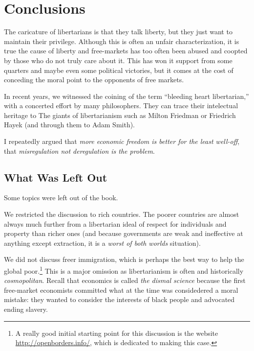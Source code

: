 \chapter{Conclusions}

The caricature of libertarians is that they talk liberty, but they just want to
maintain their privilege. Although this is often an unfair characterization, it
is true the cause of liberty and free-markets has too often been abused and
coopted by those who do not truly care about it. This has won it support from
some quarters and maybe even some political victories, but it comes at the cost
of conceding the moral point to the opponents of free markets.

In recent years, we witnessed the coining of the term ``bleeding heart
libertarian,'' with a concerted effort by many philosophers. They can trace
their intelectual heritage to The giants of libertarianism such as Milton
Friedman or Friedrich Hayek (and through them to Adam Smith).

I repeatedly argued that \emph{more economic freedom is better for the least
well-off}, that \emph{misregulation not deregulation is the problem}.

\section{What Was Left Out}

Some topics were left out of the book.

We restricted the discussion to rich countries. The poorer countries are almost
always much further from a libertarian ideal of respect for individuals and
property than richer ones (and because governments are weak and ineffective at
anything except extraction, it is a \emph{worst of both worlds} situation).

We did not discuss freer immigration, which is perhaps the best way to help the
global poor.\footnote{A really good initial starting point for this discussion
is the website \url{http://openborders.info/}, which is dedicated to making
this case.} This is a major omission as libertarianism is often and
historically \emph{cosmopolitan}. Recall that economics is called \emph{the
dismal science} because the first free-market economists committed what at the
time was considedered a moral mistake: they wanted to consider the interests of
black people and advocated ending slavery.

